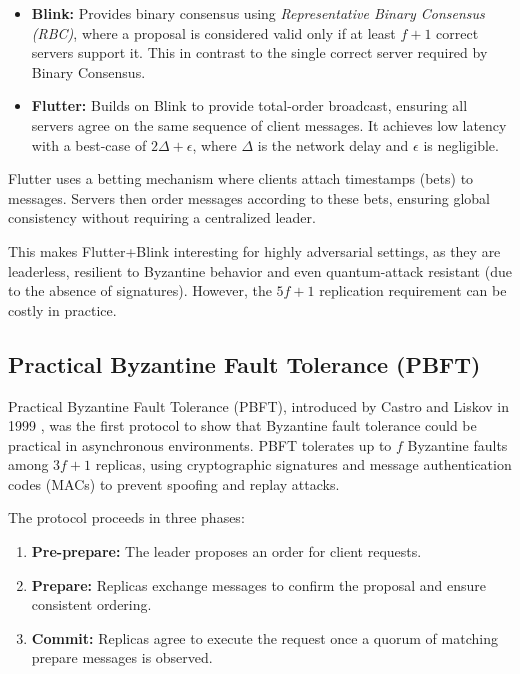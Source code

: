 \begin{itemize}
    \item \textbf{Blink:} Provides binary consensus using \emph{Representative Binary Consensus (RBC)}, where a proposal is considered valid only if at least $f+1$ correct servers support it. This in contrast to the single correct server required by Binary Consensus.
    \item \textbf{Flutter:} Builds on Blink to provide total-order broadcast, ensuring all servers agree on the same sequence of client messages.  
    It achieves low latency with a best-case of $2\Delta + \epsilon$, where $\Delta$ is the network delay and $\epsilon$ is negligible.
\end{itemize}

Flutter uses a betting mechanism where clients attach timestamps (bets) to messages. Servers then order messages according to these bets, ensuring global consistency without requiring a centralized leader.  

This makes Flutter+Blink interesting for highly adversarial settings, as they are leaderless, resilient to Byzantine behavior and even quantum-attack resistant (due to the absence of signatures). However, the $5f+1$ replication requirement can be costly in practice.

\subsection{Practical Byzantine Fault Tolerance (PBFT)}

Practical Byzantine Fault Tolerance (PBFT), introduced by Castro and Liskov in 1999 \cite{castro1999practical}, was the first protocol to show that Byzantine fault tolerance could be practical in asynchronous environments.  
PBFT tolerates up to $f$ Byzantine faults among $3f+1$ replicas, using cryptographic signatures and message authentication codes (MACs) to prevent spoofing and replay attacks.  

The protocol proceeds in three phases:
\begin{enumerate}
    \item \textbf{Pre-prepare:} The leader proposes an order for client requests.
    \item \textbf{Prepare:} Replicas exchange messages to confirm the proposal and ensure consistent ordering.
    \item \textbf{Commit:} Replicas agree to execute the request once a quorum of matching prepare messages is observed.
\end{enumerate}


